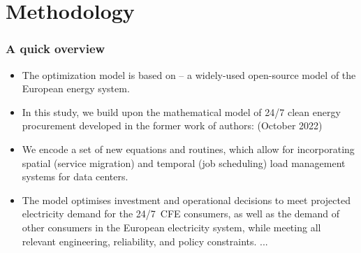 
\section{Methodology}


\begin{frame}
  \frametitle{A quick overview}

{\footnotesize
  \begin{itemize}
    
    \item The optimization model is based on  -- a widely-used open-source model of the European energy system.

    \item In this study, we build upon the mathematical model of 24/7 clean energy procurement
    developed in the former work of authors:  (October 2022)
    
    \item We encode a set of new equations and routines, which allow for incorporating spatial (service migration) and temporal (job scheduling) load management systems for data centers.

    \item The model optimises investment and operational decisions to meet projected
    electricity demand for the 24/7~CFE consumers, as well as the demand of other consumers in the European electricity system, while meeting all relevant engineering, reliability, and policy constraints. ...

    
  \end{itemize}
}

\end{frame}


